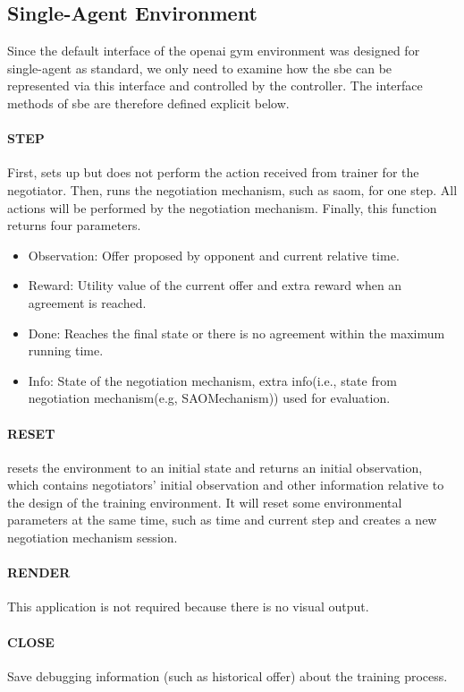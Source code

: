 \subsection{Single-Agent Environment} \label{single-agent-env}
Since the default interface of the \gls{openai gym} environment was designed for single-agent as standard, we only need to examine how the \gls{sbe} can be represented via this interface and controlled by the controller. The interface methods of \gls{sbe} are therefore defined explicit below. 

\paragraph{STEP} First, sets up but does not perform the action received from trainer for the negotiator. Then, runs the negotiation mechanism, such as \gls{saom}, for one step. All actions will be performed by the negotiation mechanism. Finally, this function returns four parameters.

\begin{itemize}
	\item Observation: Offer proposed by opponent and current relative time.
	\item Reward: Utility value of the current offer and extra reward when an agreement is reached.
	\item Done: Reaches the final state or there is no agreement within the maximum running time.
	\item Info: State of the negotiation mechanism, extra info(i.e., state from negotiation mechanism(e.g, SAOMechanism)) used for evaluation.
\end{itemize}

\paragraph{RESET} resets the environment to an initial state and returns an initial observation, which contains negotiators' initial observation and other information relative to the design of the training environment. It will reset some environmental parameters at the same time, such as time and current step and creates a new negotiation mechanism session.
\paragraph{RENDER} This application is not required because there is no visual output.
\paragraph{CLOSE} Save debugging information (such as historical offer) about the training process.
